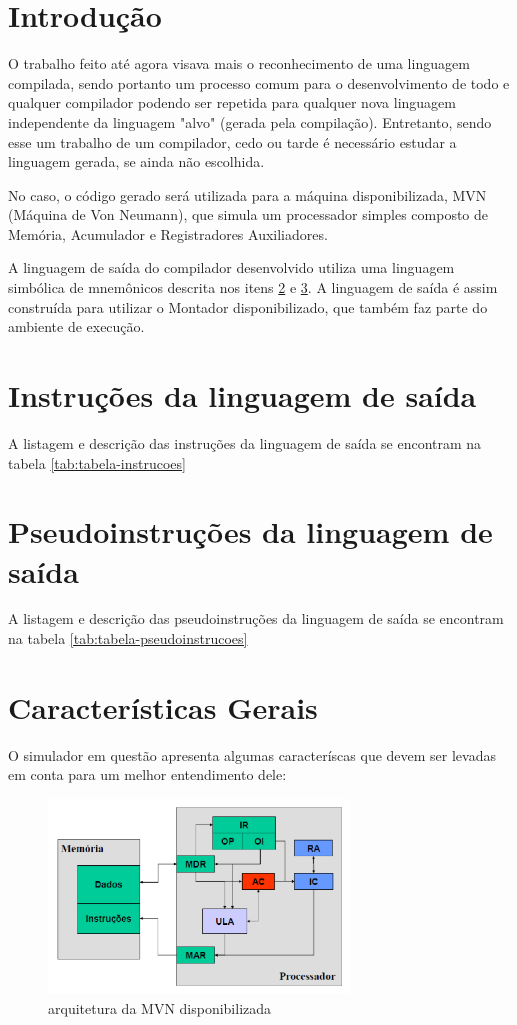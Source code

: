 \label{Cap:Ambiente de Execução}

\section{Introdução}
O trabalho feito até agora visava mais o reconhecimento de uma linguagem compilada, sendo portanto um processo comum para o desenvolvimento de todo e qualquer compilador podendo ser repetida para qualquer nova linguagem independente da linguagem "alvo" (gerada pela compilação). Entretanto, sendo esse um trabalho de um compilador, cedo ou tarde é necessário estudar a linguagem gerada, se ainda não escolhida.

No caso, o código gerado será utilizada para a máquina disponibilizada, MVN (Máquina de Von Neumann)\cite{mvn_implementation}, que simula um processador simples composto de Memória, Acumulador e Registradores Auxiliadores.

A linguagem de saída do compilador desenvolvido utiliza uma linguagem simbólica de mnemônicos descrita nos itens \ref{sec:instrucoes} e  \ref{sec:pseudoinstrucoes}. A linguagem de saída é assim construída para utilizar o Montador disponibilizado, que também faz parte do ambiente de execução.

\section{Instruções da linguagem de saída}
\label{sec:instrucoes}
A listagem e descrição das instruções da linguagem de saída se encontram na tabela \ref{tab:tabela-instrucoes}


\section{Pseudoinstruções da linguagem de saída}
\label{sec:pseudoinstrucoes}
A listagem e descrição das pseudoinstruções da linguagem de saída se encontram na tabela \ref{tab:tabela-pseudoinstrucoes}


\section{Características Gerais}
O simulador em questão apresenta algumas caracteríscas que devem ser levadas em conta para um melhor entendimento dele:

\begin{figure}[H]
\centering
\includegraphics[width=8cm,keepaspectratio]{figuras/mvn.png}
\caption{\label{fig:mvn} arquitetura da MVN disponibilizada}
\end{figure}


